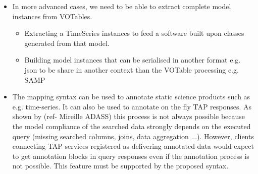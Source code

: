 \begin{itemize}
  \item In more advanced cases, we need to be able to extract complete model instances from VOTables.
    \begin{itemize}
      \item Extracting a TimeSeries instances to feed a software built upon classes generated from that model.
      \item Building model instances that can be serialised in another format e.g. json to be share in another context than the VOTable processing e.g. SAMP
   \end{itemize}         
    
   \item The mapping syntax can be used to annotate static science products such as e.g. time-series. It can also be used to annotate on the fly TAP responses.
   As shown by (ref- Mireille ADASS) this process is not always possible because the model compliance of the searched data strongly depends on the executed query (missing searched columns, joins, data aggregation ...). 
   However, clients connecting TAP services registered as delivering annotated data would expect to get annotation blocks in query responses even if the annotation process is not possible. 
   This feature must be supported by the proposed syntax.
    
\end{itemize} 

